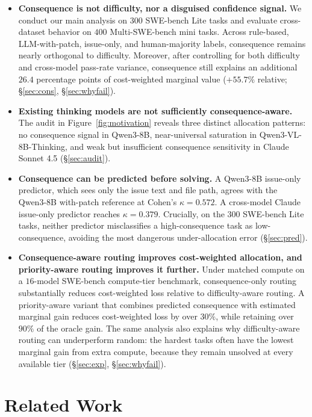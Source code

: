 \documentclass{article}
\begin{document}
\begin{itemize}
\item[(1)] \textbf{Consequence is not difficulty, nor a disguised
confidence signal.} We conduct our main analysis on $300$ SWE-bench
Lite tasks and evaluate cross-dataset behavior on $400$
Multi-SWE-bench mini tasks. Across rule-based, LLM-with-patch,
issue-only, and human-majority labels, consequence remains nearly
orthogonal to difficulty. Moreover, after controlling for both
difficulty and cross-model pass-rate variance, consequence still
explains an additional $26.4$ percentage points of cost-weighted
marginal value ($+55.7\%$ relative; \S\ref{sec:cons},
\S\ref{sec:whyfail}).

\item[(2)] \textbf{Existing thinking models are not sufficiently
consequence-aware.} The audit in Figure~\ref{fig:motivation} reveals
three distinct allocation patterns: no consequence signal in Qwen3-8B,
near-universal saturation in Qwen3-VL-8B-Thinking, and weak but
insufficient consequence sensitivity in Claude Sonnet 4.5
(\S\ref{sec:audit}).

\item[(3)] \textbf{Consequence can be predicted before solving.} A
Qwen3-8B issue-only predictor, which sees only the issue text and file
path, agrees with the Qwen3-8B with-patch reference at Cohen's
$\kappa = 0.572$. A cross-model Claude issue-only predictor reaches
$\kappa = 0.379$. Crucially, on the $300$ SWE-bench Lite tasks,
neither predictor misclassifies a high-consequence task as
low-consequence, avoiding the most dangerous under-allocation error
(\S\ref{sec:pred}).

\item[(4)] \textbf{Consequence-aware routing improves cost-weighted
allocation, and priority-aware routing improves it further.} Under
matched compute on a $16$-model SWE-bench compute-tier benchmark,
consequence-only routing substantially reduces cost-weighted loss
relative to difficulty-aware routing. A priority-aware variant that
combines predicted consequence with estimated marginal gain reduces
cost-weighted loss by over $30\%$, while retaining over $90\%$ of the
oracle gain. The same analysis also explains why difficulty-aware
routing can underperform random: the hardest tasks often have the
lowest marginal gain from extra compute, because they remain unsolved
at every available tier (\S\ref{sec:exp}, \S\ref{sec:whyfail}).
\end{itemize}

\section{Related Work}
\end{document}
